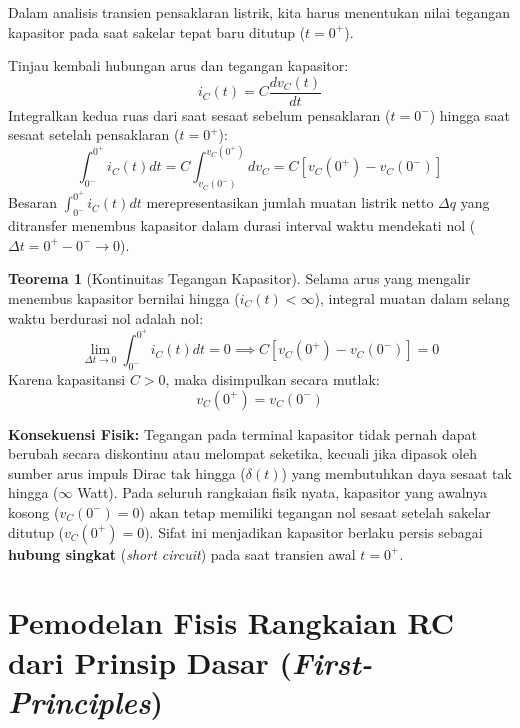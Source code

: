 \documentclass[11pt,a4paper]{article}
\theoremstyle{definition}
\newtheorem{theorem}{Teorema}[section]
\begin{document}
Dalam analisis transien pensaklaran listrik, kita harus menentukan nilai tegangan kapasitor pada saat sakelar tepat baru ditutup ($t = 0^+$).

Tinjau kembali hubungan arus dan tegangan kapasitor:
\begin{equation}
    i_C(t) = C \frac{dv_C(t)}{dt}
\end{equation}
Integralkan kedua ruas dari saat sesaat sebelum pensaklaran ($t = 0^-$) hingga saat sesaat setelah pensaklaran ($t = 0^+$):
\begin{equation}
    \int_{0^-}^{0^+} i_C(t) dt = C \int_{v_C(0^-)}^{v_C(0^+)} dv_C = C \left[ v_C(0^+) - v_C(0^-) \right]
\end{equation}
Besaran $\int_{0^-}^{0^+} i_C(t) dt$ merepresentasikan jumlah muatan listrik netto $\Delta q$ yang ditransfer menembus kapasitor dalam durasi interval waktu mendekati nol ($\Delta t = 0^+ - 0^- \to 0$).

\begin{theorem}[Kontinuitas Tegangan Kapasitor]
Selama arus yang mengalir menembus kapasitor bernilai hingga ($i_C(t) < \infty$), integral muatan dalam selang waktu berdurasi nol adalah nol:
\begin{equation}
    \lim_{\Delta t \to 0} \int_{0^-}^{0^+} i_C(t) dt = 0 \implies C \left[ v_C(0^+) - v_C(0^-) \right] = 0
\end{equation}
Karena kapasitansi $C > 0$, maka disimpulkan secara mutlak:
\begin{equation}
    v_C(0^+) = v_C(0^-)
    \label{eq:continuity_vc}
\end{equation}
\end{theorem}

\textbf{Konsekuensi Fisik:} Tegangan pada terminal kapasitor tidak pernah dapat berubah secara diskontinu atau melompat seketika, kecuali jika dipasok oleh sumber arus impuls Dirac tak hingga ($\delta(t)$) yang membutuhkan daya sesaat tak hingga ($\infty$ Watt). Pada seluruh rangkaian fisik nyata, kapasitor yang awalnya kosong ($v_C(0^-) = 0$) akan tetap memiliki tegangan nol sesaat setelah sakelar ditutup ($v_C(0^+) = 0$). Sifat ini menjadikan kapasitor berlaku persis sebagai \textbf{hubung singkat} (\textit{short circuit}) pada saat transien awal $t = 0^+$.

\section{Pemodelan Fisis Rangkaian RC dari Prinsip Dasar (\textit{First-Principles})}
\end{document}
